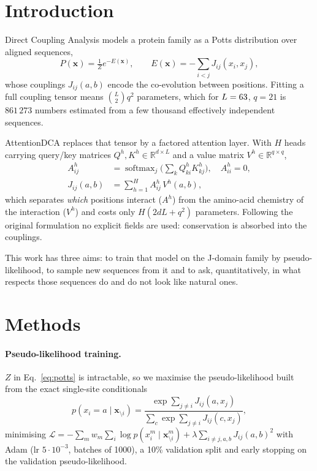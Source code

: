\documentclass[10pt,twocolumn,a4paper]{article}
\begin{document}
\section{Introduction}
Direct Coupling Analysis models a protein family as a Potts distribution over aligned sequences,
\begin{equation}
P(\bm x)=\tfrac1Z e^{-E(\bm x)},\qquad E(\bm x)=-\sum_{i<j}J_{ij}(x_i,x_j),
\label{eq:potts}
\end{equation}
whose couplings $J_{ij}(a,b)$ encode the co-evolution between positions. Fitting a full coupling
tensor means $\binom{L}{2}q^2$ parameters, which for $L=63$, $q=21$ is $861\,273$ numbers
estimated from a few thousand effectively independent sequences.

AttentionDCA replaces that tensor by a factored attention layer. With $H$ heads carrying
query/key matrices $Q^h,K^h\in\mathbb R^{d\times L}$ and a value matrix $V^h\in\mathbb R^{q\times q}$,
\begin{align}
A^h_{ij}&=\operatorname{softmax}_j\big(\textstyle\sum_k Q^h_{ki}K^h_{kj}\big),\quad A^h_{ii}=0,\\
J_{ij}(a,b)&=\sum_{h=1}^{H}A^h_{ij}\,V^h(a,b),
\label{eq:att}
\end{align}
which separates \emph{which} positions interact ($A^h$) from the amino-acid chemistry of the
interaction ($V^h$) and costs only $H(2dL+q^2)$ parameters. Following the original formulation no
explicit fields are used: conservation is absorbed into the couplings.

This work has three aims: to train that model on the J-domain family by pseudo-likelihood, to
sample new sequences from it and to ask, quantitatively, in what respects those sequences do and
do not look like natural ones.

\section{Methods}
\paragraph{Pseudo-likelihood training.} $Z$ in Eq.~\eqref{eq:potts} is intractable, so we maximise
the pseudo-likelihood built from the exact single-site conditionals
\begin{equation}
p(x_i=a\mid\bm x_{\setminus i})=\frac{\exp\sum_{j\neq i}J_{ij}(a,x_j)}
{\sum_c\exp\sum_{j\neq i}J_{ij}(c,x_j)},
\label{eq:cond}
\end{equation}
minimising $\mathcal L=-\sum_m w_m\sum_i\log p(x^m_i\mid\bm x^m_{\setminus i})
+\lambda\sum_{i\neq j,a,b}J_{ij}(a,b)^2$ with Adam (lr $5\cdot10^{-3}$, batches of 1000), a 10\%
validation split and early stopping on the validation pseudo-likelihood.
\end{document}
